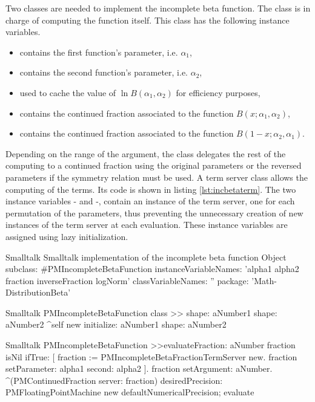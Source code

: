 Two classes are needed to implement the incomplete beta function.
The class  is in charge of
computing the function itself. This class has the following
instance variables.
\begin{itemize}
\item {} contains the first function's parameter, i.e.
$\alpha_1$,
\item {} contains the second function's parameter, i.e.
$\alpha_2$,
\item {} used to cache the value of $\ln B\left(\alpha_1,\alpha_2\right)$ for efficiency purposes,
\item {} contains the continued fraction associated to the
function $B\left(x;\alpha_1,\alpha_2\right)$,
\item {} contains the continued fraction associated to the
function $B\left(1-x;\alpha_2,\alpha_1\right)$.
\end{itemize}
Depending on the range of the argument, the class delegates the
rest of the computing to a continued fraction using the original
parameters or the reversed parameters if the symmetry relation
must be used. A term server class allows the computing of the
terms. Its code is shown in listing \ref{lst:incbetaterm}. The two
instance variables -  and  -,
contain an instance of the term server, one for each permutation
of the parameters, thus preventing the unnecessary creation of new
instances of the term server at each evaluation. These instance
variables are assigned using lazy initialization.

\begin{listing}[label=lst:incbeta]{Smalltalk}
{Smalltalk implementation of the incomplete beta function}
Object subclass: #PMIncompleteBetaFunction
   instanceVariableNames: 'alpha1 alpha2 fraction inverseFraction logNorm'
   classVariableNames: ''
   package: 'Math-DistributionBeta'
\end{listing}

\begin{displaycode}{Smalltalk}
PMIncompleteBetaFunction class >> shape: aNumber1 shape: aNumber2
   ^self new initialize: aNumber1 shape: aNumber2
\end{displaycode}

\begin{displaycode}{Smalltalk}
PMIncompleteBetaFunction >>evaluateFraction: aNumber
    fraction isNil 
        ifTrue: 
            [ fraction := PMIncompleteBetaFractionTermServer new.
            fraction setParameter: alpha1 second: alpha2 ].
    fraction setArgument: aNumber.
    ^(PMContinuedFraction server: fraction)
        desiredPrecision: PMFloatingPointMachine new defaultNumericalPrecision;
        evaluate
\end{displaycode}

